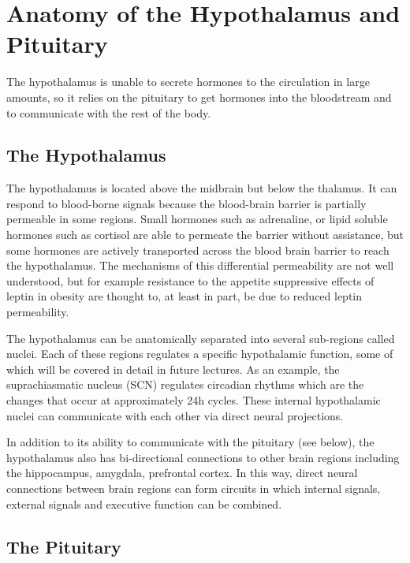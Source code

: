 \documentclass{tufte-handout}
\begin{document}
\pagebreak

\section{Anatomy of the Hypothalamus and Pituitary}
The hypothalamus is unable to secrete hormones to the circulation in large amounts, so it relies on the pituitary to get hormones into the bloodstream and to communicate with the rest of the body.

\subsection{The Hypothalamus}

The hypothalamus is located above the midbrain but below the thalamus.  It can respond to blood-borne signals because the blood-brain barrier is partially permeable in some regions.  Small hormones such as adrenaline, or lipid soluble hormones such as cortisol are able to permeate the barrier without assistance, but some hormones are actively transported across the blood brain barrier to reach the hypothalamus\cite{Huber2001}.  The mechanisms of this differential permeability are not well understood, but for example resistance to the appetite suppressive effects of leptin in obesity are thought to, at least in part, be due to reduced leptin permeability\cite{Burguera2000}. 

  The hypothalamus can be anatomically separated into several sub-regions called nuclei.  Each of these regions regulates a specific hypothalamic function, some of which will be covered in detail in future lectures.  As an example, the suprachiasmatic nucleus (SCN) regulates circadian rhythms which are the changes that occur at approximately 24h cycles.  These internal hypothalamic nuclei can communicate with each other via direct neural projections.

  In addition to its ability to communicate with the pituitary (see below), the hypothalamus also has bi-directional connections to other brain regions including the hippocampus, amygdala, prefrontal cortex.  In this way, direct neural connections between brain regions can form circuits in which internal signals, external signals and executive function can be combined.

\subsection{The Pituitary}
\end{document}
